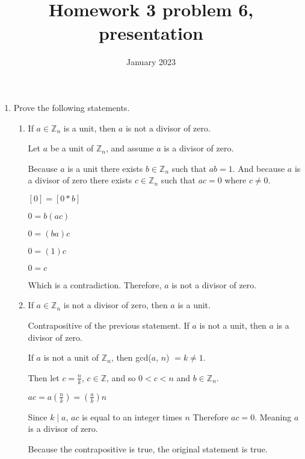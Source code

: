 \documentclass{article}
\title{Homework 3 problem 6, presentation}
\date{January 2023}
\begin{document}
\maketitle
\begin{enumerate}

    \item Prove the following statements.
    
    \begin{enumerate}
        \item If $a \in \mathbb{Z}_n$ is a unit, then $a$ is not a divisor of zero.
        
        Let $a$ be a unit of $\mathbb{Z}_n$, and assume $a$ is a divisor of zero. 
        
        Because $a$ is a unit there exists $b \in \mathbb{Z}_n$ such that $ab = 1$. 
        And because $a$ is a divisor of zero there exists
        $c \in \mathbb{Z}_n$ such that $ac = 0$ where $c \neq 0$.

        $[0] = [0 * b]$

        $0 = b(ac)$

        $0 = (ba)c$

        $0 = (1)c$

        $0 = c$

        Which is a contradiction. Therefore, $a$ is not a divisor of zero.

        \item If $a \in \mathbb{Z}_n$ is not a divisor of zero, then $a$ is a unit.
        
        Contrapositive of the previous statement. If $a$ is not a unit, then $a$ is a divisor of zero.

        If $a$ is not a unit of $\mathbb{Z}_n$, then gcd($a$, $n$) $= k \neq 1$.

        Then let $c = \frac{n}{k}$, $c \in \mathbb{Z}$, and so $0<c<n$ and $b \in \mathbb{Z}_n$.

        $ac = a(\frac{n}{k})= (\frac{a}{k})n$

        Since $k \mid a$, $ac$ is equal to an integer times $n$
        Therefore $ac = 0$. Meaning $a$ is a divisor of zero.

        Because the contrapositive is true, the original statement is true.
        

    \end{enumerate}

\end{enumerate}
    
\end{document}
